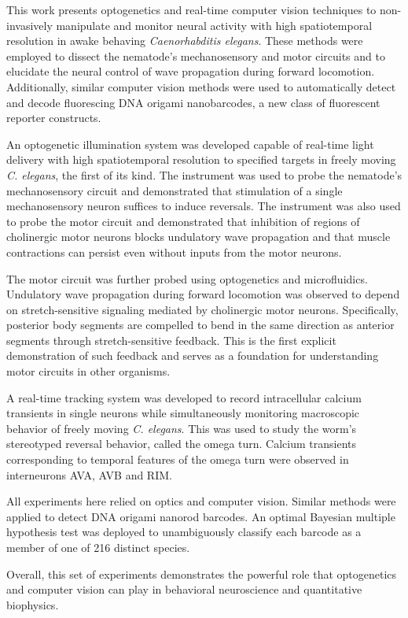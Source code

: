 





This work presents optogenetics and real-time computer vision techniques to non-invasively manipulate and monitor neural activity with high spatiotemporal resolution in awake behaving \textit{Caenorhabditis elegans}. These methods were employed to dissect the nematode's mechanosensory and motor circuits and to elucidate the neural control of wave propagation during forward locomotion.  Additionally, similar computer vision methods were used to automatically detect and decode fluorescing DNA origami nanobarcodes, a new class of fluorescent reporter constructs.

An optogenetic illumination system was developed capable of real-time light delivery with high spatiotemporal resolution to specified targets in freely moving \textit{C. elegans}, the first of its kind. The instrument was used to probe the nematode's mechanosensory circuit and demonstrated that stimulation of a single mechanosensory neuron suffices to induce reversals. The instrument was also used to probe the motor circuit and demonstrated that inhibition of regions of cholinergic motor neurons blocks undulatory wave propagation and that muscle contractions can persist even without inputs from the motor neurons.

The motor circuit was further probed using optogenetics and microfluidics. Undulatory wave propagation during forward locomotion was observed to depend on stretch-sensitive signaling mediated by cholinergic motor neurons. Specifically, posterior body segments are compelled to bend in the same
direction as anterior segments through stretch-sensitive feedback. This is the first explicit demonstration of such feedback and serves as a foundation for understanding motor circuits in other organisms. 

A real-time tracking system was developed to record intracellular calcium transients in single neurons while simultaneously monitoring macroscopic behavior of freely moving \textit{C. elegans}. This was used to study the worm's stereotyped reversal behavior, called the omega turn. Calcium transients corresponding to temporal features of the omega turn were observed in interneurons AVA, AVB and RIM.

All experiments here relied on optics and computer vision. Similar methods were applied to detect DNA origami nanorod barcodes. An optimal Bayesian multiple hypothesis test was deployed to unambiguously classify each barcode as a member of one of 216 distinct species.

Overall, this set of experiments demonstrates the powerful role that optogenetics and computer vision can play in behavioral neuroscience and quantitative biophysics.